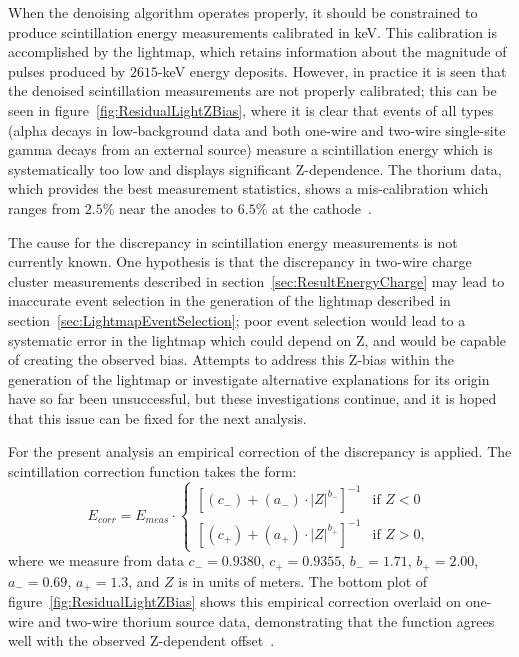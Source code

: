 When the denoising algorithm operates properly, it should be constrained to produce scintillation energy measurements calibrated in keV.  This calibration is accomplished by the lightmap, which retains information about the magnitude of pulses produced by $2615$-keV energy deposits.  However, in practice it is seen that the denoised scintillation measurements are not properly calibrated; this can be seen in figure~\ref{fig:ResidualLightZBias}, where it is clear that events of all types (alpha decays in low-background data and both one-wire and two-wire single-site gamma decays from an external source) measure a scintillation energy which is systematically too low and displays significant Z-dependence.  The thorium data, which provides the best measurement statistics, shows a mis-calibration which ranges from $2.5\%$ near the anodes to $6.5\%$ at the cathode~\cite{EnergyDocumentRun2ab}.

The cause for the discrepancy in scintillation energy measurements is not currently known.  One hypothesis is that the discrepancy in two-wire charge cluster measurements described in section~\ref{sec:ResultEnergyCharge} may lead to inaccurate event selection in the generation of the lightmap described in section~\ref{sec:LightmapEventSelection}; poor event selection would lead to a systematic error in the lightmap which could depend on Z, and would be capable of creating the observed bias.  Attempts to address this Z-bias within the generation of the lightmap or investigate alternative explanations for its origin have so far been unsuccessful, but these investigations continue, and it is hoped that this issue can be fixed for the next analysis.

For the present analysis an empirical correction of the discrepancy is applied.  The scintillation correction function takes the form:
\begin{equation}\label{eqn:EmpiricalLightCorrection}
E_{corr} = E_{meas}\cdot \begin{cases}
\left[ (c_{-}) + (a_{-})\cdot |Z|^{b_{-}} \right]^{-1} & \text{if } Z < 0\\
\left[ (c_{+}) + (a_{+})\cdot |Z|^{b_{+}} \right]^{-1} & \text{if } Z > 0,
\end{cases}\end{equation}
where we measure from data $c_{-} = 0.9380$, $c_{+} = 0.9355$, $b_{-} = 1.71$, $b_{+} = 2.00$, $a_{-} = 0.69$, $a_{+} = 1.3$, and $Z$ is in units of meters.  The bottom plot of figure~\ref{fig:ResidualLightZBias} shows this empirical correction overlaid on one-wire and two-wire thorium source data, demonstrating that the function agrees well with the observed Z-dependent offset~\cite{EnergyDocumentRun2ab}.

